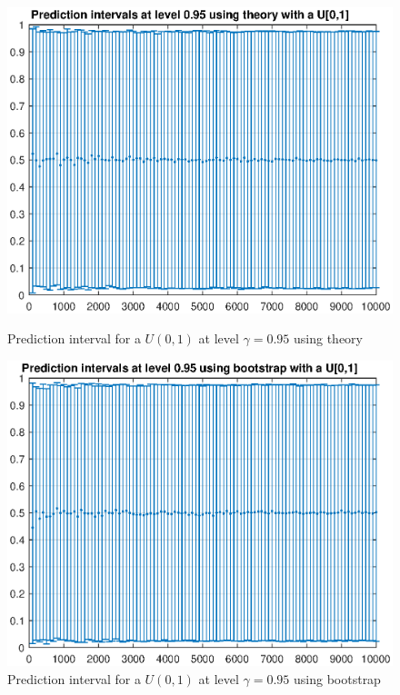 \documentclass[11pt,a4paper]{article}
\begin{document}
\begin{figure}[ht]
	\centering
	\begin{minipage}{0.45\textwidth}
		\centering
		\includegraphics[width=\textwidth]{PI_theory}
		\caption{Prediction interval for a $U(0,1)$ at level $\gamma = 0.95$ using theory}
		\label{fig:PI_theory}
	\end{minipage}
	\begin{minipage}{0.45\textwidth}
		\centering
		\includegraphics[width=\textwidth]{PI_bootstrap}
		\caption{Prediction interval for a $U(0,1)$ at level $\gamma = 0.95$ using bootstrap}
		\label{fig:PI_bootstrap}
	\end{minipage}
\end{figure}
\end{document}
